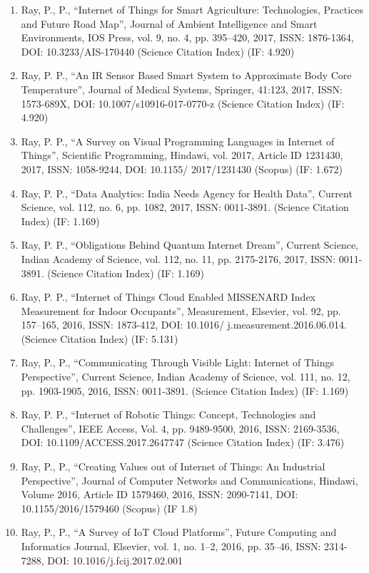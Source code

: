 \documentclass[11pt,a4paper]{moderncv}
\begin{document}
\begin{adjustwidth}{6em}{0pt}
\begin{enumerate}
		\item Ray, P., P., “Internet of Things for Smart Agriculture: Technologies, Practices and Future Road Map”, Journal of Ambient Intelligence and Smart Environments, IOS Press, vol. 9, no. 4, pp. 395–420, 2017, ISSN: 1876-1364, DOI: 10.3233/AIS-170440 (Science Citation Index) (IF: 4.920)
		
		\item Ray, P. P., “An IR Sensor Based Smart System to Approximate Body Core Temperature”, Journal of Medical Systems, Springer, 41:123, 2017, ISSN: 1573-689X, DOI: 10.1007/s10916-017-0770-z (Science Citation Index) (IF: 4.920)
		
		\item Ray, P. P., “A Survey on Visual Programming Languages in Internet of Things”, Scientific Programming, Hindawi, vol. 2017, Article ID 1231430, 2017, ISSN: 1058-9244, DOI: 10.1155/ 2017/1231430 (Scopus) (IF: 1.672)
		
		\item Ray, P. P., “Data Analytics: India Needs Agency for Health Data”, Current Science, vol. 112, no. 6, pp. 1082, 2017, ISSN: 0011-3891. (Science Citation Index) (IF: 1.169)
		
		\item Ray, P. P., “Obligations Behind Quantum Internet Dream”, Current Science, Indian Academy of Science, vol. 112, no. 11, pp. 2175-2176, 2017, ISSN: 0011-3891. (Science Citation Index) (IF: 1.169)
		
		\item Ray, P. P., “Internet of Things Cloud Enabled MISSENARD Index Measurement for Indoor Occupants”, Measurement, Elsevier, vol. 92, pp. 157–165, 2016, ISSN: 1873-412, DOI: 10.1016/ j.measurement.2016.06.014. (Science Citation Index) (IF: 5.131)
		
		\item Ray, P., P., “Communicating Through Visible Light: Internet of Things Perspective”, Current Science, Indian Academy of Science, vol. 111, no. 12, pp. 1903-1905, 2016, ISSN: 0011-3891. (Science Citation Index) (IF: 1.169)
		
		\item Ray, P. P., “Internet of Robotic Things: Concept, Technologies and Challenges”, IEEE Access, Vol. 4, pp. 9489-9500, 2016, ISSN: 2169-3536, DOI: 10.1109/ACCESS.2017.2647747 (Science Citation Index) (IF: 3.476)
		
		\item Ray, P., P., “Creating Values out of Internet of Things: An Industrial Perspective”, Journal of Computer Networks and Communications, Hindawi, Volume 2016, Article ID 1579460, 2016, ISSN: 2090-7141, DOI: 10.1155/2016/1579460 (Scopus) (IF 1.8)
		
		\item Ray, P., P., “A Survey of IoT Cloud Platforms”, Future Computing and Informatics Journal, Elsevier, vol. 1, no. 1–2, 2016, pp. 35–46, ISSN: 2314-7288, DOI: 10.1016/j.fcij.2017.02.001
		
		
		
	\end{enumerate}
\end{adjustwidth}
\end{document}
